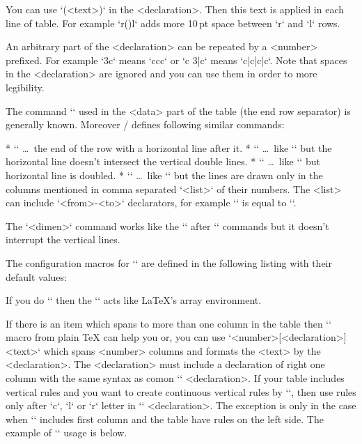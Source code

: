 {You can use `(<text>)` in the <declaration>. Then this text is applied in
each line of table. For example `r(\kern10pt)l` adds more 10\,pt space
between `r` and `l` rows. 

An arbitrary part of the <declaration> can be repeated by a <number>
prefixed. For example `3c` means `ccc` or `c 3{|c}` means
`c|c|c|c`. Note that spaces in the <declaration> are ignored and you 
can use them in order to more legibility.
 
The command `\cr` used in the <data> part of the table (the end row
separator) is generally known. 
Moreover \OpTeX/ defines following similar commands:

\begitems
* `\crl` \dots\ the end of the row with a horizontal line after it.
* `\crli` \dots\ like `\crl` but the horizontal line doesn't intersect the
      vertical double lines.
* `\crlli` \dots\ like `\crli` but horizontal line is doubled.
* `` \dots\ like `\crli` but the lines are drawn only in the
  columns mentioned in comma separated `<list>` of their numbers.
  The <list> can include `<from>-<to>` declarators, for example
  `` is equal to ``. 
\enditems

The `\tskip<dimen>` command works like the `` 
after `\cr*` commands but it doesn't interrupt the vertical lines.

The configuration macros for `\table` are defined in the following listing
with their default values:

\begtt
\def\tabiteml{\enspace} %
\def\tabitemr{\enspace} %
\def\tabstrut{\strut}   %
\def\vvkern{1pt}        %
\def\hhkern{1pt}        %
\endtt

If you do `\def\tabiteml{$\enspace}\def\tabitemr{\enspace$}` then
the `\table` acts like \LaTeX's array environment.

If there is an item which spans to more than one column in the table then
`` macro from plain \TeX{} can help you or, you can use
`\mspan<number>[<declaration>]{<text>}`
which spans <number> columns and formats the <text> by the
<declaration>. The <declaration> must include a declaration of right one column
with the same syntax as comon `\table` <declaration>.
If your table includes vertical rules and you want to
create continuous vertical rules by `\mspan`, then use rules
only after `c`, `l` or `r` letter in `\mspan` <declaration>. The
exception is only in the case when `\mspan` includes first
column and the table have rules on the left side. The example of `\mspan` usage is below.

}
